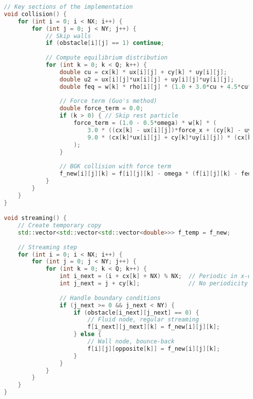 \documentclass[12pt]{article}
\begin{document}
\begin{lstlisting}[language=C++, caption=Main LBM implementation]
// Key sections of the implementation
void collision() {
    for (int i = 0; i < NX; i++) {
        for (int j = 0; j < NY; j++) {
            // Skip walls
            if (obstacle[i][j] == 1) continue;
            
            // Compute equilibrium distribution
            for (int k = 0; k < Q; k++) {
                double cu = cx[k] * ux[i][j] + cy[k] * uy[i][j];
                double u2 = ux[i][j]*ux[i][j] + uy[i][j]*uy[i][j];
                double feq = w[k] * rho[i][j] * (1.0 + 3.0*cu + 4.5*cu*cu - 1.5*u2);
                
                // Force term (Guo's method)
                double force_term = 0.0;
                if (k > 0) { // Skip rest particle
                    force_term = (1.0 - 0.5*omega) * w[k] * (
                        3.0 * ((cx[k] - ux[i][j])*force_x + (cy[k] - uy[i][j])*force_y) +
                        9.0 * (cx[k]*ux[i][j] + cy[k]*uy[i][j]) * (cx[k]*force_x + cy[k]*force_y)
                    );
                }
                
                // BGK collision with force term
                f_new[i][j][k] = f[i][j][k] - omega * (f[i][j][k] - feq) + force_term;
            }
        }
    }
}

void streaming() {
    // Create temporary copy
    std::vector<std::vector<std::vector<double>>> f_temp = f_new;
    
    // Streaming step
    for (int i = 0; i < NX; i++) {
        for (int j = 0; j < NY; j++) {
            for (int k = 0; k < Q; k++) {
                int i_next = (i + cx[k] + NX) % NX;  // Periodic in x-direction
                int j_next = j + cy[k];              // No periodicity in y-direction
                
                // Handle boundary conditions
                if (j_next >= 0 && j_next < NY) {
                    if (obstacle[i_next][j_next] == 0) {
                        // Fluid node, regular streaming
                        f[i_next][j_next][k] = f_new[i][j][k];
                    } else {
                        // Wall node, bounce-back
                        f[i][j][opposite[k]] = f_new[i][j][k];
                    }
                }
            }
        }
    }
}
\end{lstlisting}
\end{document}
